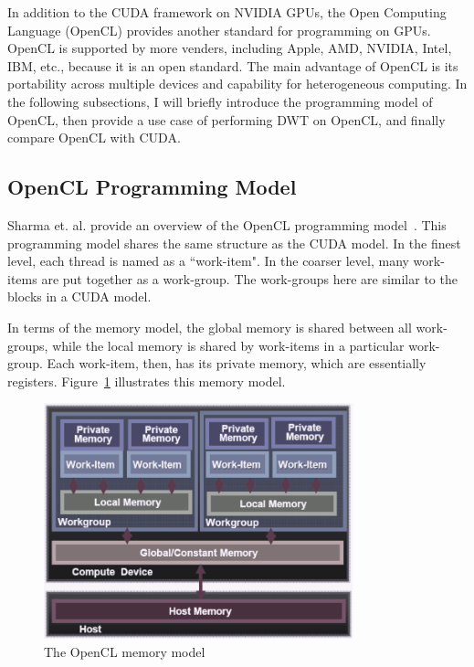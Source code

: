 In addition to the CUDA framework on NVIDIA GPUs, the Open Computing 
Language (OpenCL) provides another standard for programming on GPUs.
%
OpenCL is supported by more venders, including Apple, AMD, NVIDIA, Intel, 
IBM, etc., because it is an open standard.
%
The main advantage of OpenCL is its portability across multiple devices and 
capability for heterogeneous computing.
%
In the following subsections, I will briefly introduce the programming 
model of OpenCL, 
then provide a use case of performing DWT on OpenCL, 
and finally compare OpenCL with CUDA.


\subsection{OpenCL Programming Model}
\label{sec:opencl-model}
%
Sharma et. al. provide an overview of the OpenCL programming 
model~\cite{sharma2010parallel}.
%
This programming model shares the same structure as the CUDA model.
%
In the finest level, each thread is named as a ``work-item".
%
In the coarser level, many work-items are put together as a 
work-group. 
%
The work-groups here are similar to the blocks in a CUDA model. 


In terms of the memory model, the global memory is shared between all
work-groups, while the local memory is shared by work-items in 
a particular work-group. 
%
Each work-item, then, has its private memory, which are essentially registers.
%
Figure~\ref{fig:opencl-model} illustrates this memory model.

\begin{figure}
    \centering
    \includegraphics[width=0.8\textwidth]{fig/opencl-model.png}
    \caption{The OpenCL memory model}
    \label{fig:opencl-model}
\end{figure}


